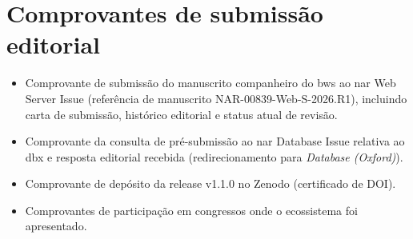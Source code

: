\chapter{Comprovantes de submissão editorial}
\label{ape:comprovantes}


\begin{itemize}
    \item Comprovante de submissão do manuscrito companheiro do \gls{bws} ao \gls{nar} Web Server Issue (referência de manuscrito NAR-00839-Web-S-2026.R1), incluindo carta de submissão, histórico editorial e status atual de revisão.
    \item Comprovante da consulta de pré-submissão ao \gls{nar} Database Issue relativa ao \gls{dbx} e resposta editorial recebida (redirecionamento para \textit{Database (Oxford)}).
    \item Comprovante de depósito da release v1.1.0 no Zenodo (certificado de DOI).
    \item Comprovantes de participação em congressos onde o ecossistema \biorempp{} foi apresentado.
\end{itemize}


